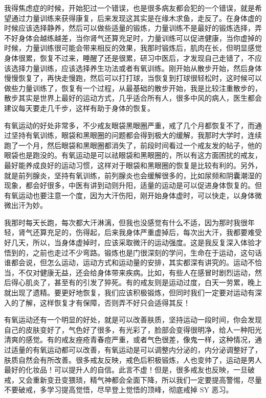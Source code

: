 \documentclass{ctexart}
\begin{document}
我得焦虑症的时候，开始犯过一个错误，也是很多病友都会犯的一个错误，就是希望通过力量训练来获得康复，后来发现这其实是在缘木求鱼，走反了。在身体虚的时候应该选择静养，然后可以做些适量的锻炼，力量训练不是最好的锻炼选择，弄不好身体会越练越差，当你肾气还算充足时，力量训练可以促进健康，当你虚掉的时候，力量训练很可能会带来相反的效果，我那时锻炼后，肌肉在长，但明显感觉身体很累，恢复不过来，睡醒了还是很累，研习中医后，才发现自己走错了，不应该选择力量训练，应该选择养生功法或者有氧训练。刚开始从散步开始，然后身体慢慢恢复了，再快走慢跑，然后可以打打球，当恢复到打球很轻松时，这时候可以做些力量训练了，恢复有一个过程，从最基础的散步开始，我是比较注重散步的，散步其实是世界上最好的运动方式，几乎适合所有人，很多中风的病人，医生都会建议每天要走几千步，这样有助于身体的恢复。

有氧运动的好处非常多，不少戒友眼袋黑眼圈严重，戒了几个月都恢复不了，而通过坚持有氧训练，眼袋和黑眼圈的问题都会得到极大的缓解，我那时大学时，连续跑了一个月，然后眼袋和黑眼圈都消失了，前段时间看过一个戒友发的帖子，他的眼袋也是跑没的。有氧运动是可以祛眼袋和黑眼圈的，所以有这方面困扰的戒友，最好能养成良好的运动习惯，这样对于眼袋和黑眼圈的恢复是比较有利的。另外，就是前列腺炎，坚持有氧训练，前列腺炎也会缓解很多的，比如尿频和阴囊潮湿的现象，都会好很多，中医有讲到动则升阳，适量的运动是可以促进身体恢复的。但有氧运动也要注意一个度，因为大汗伤阳，刚开始身体虚时，可以快走，以身体微微出汗为妙。

我那时每天长跑，每次都大汗淋漓，但我也没感觉有什么不适，因为那时我很年轻，肾气还算充足的，伤得起，后来我身体严重虚掉后，每次出大汗，我都要难受好几天，所以，当身体虚掉时，应该采取微汗的运动强度。这是我反复深入体验才悟到的，之前也走过不少弯路。锻炼也是门很深刻的学问，生命在于运动，这句话谁都会说，但怎么运动，运动方式和运动量的安排，其实都深有讲究的。运动不恰当，不仅对健康无益，还会给身体带来疾病。比如，有些人在感冒时剧烈运动，然后得心肌炎了，甚至有的引发了猝死。有的戒友则是运动过度，白天一劳累，晚上就出现了遗精。要更好地恢复，我们应该积极锻炼，但同时我们一定要对运动有深入的了解，这样恢复才有保障，否则弄不好只会适得其反！

有氧运动还有一个明显的好处，就是可以改善肤质，坚持运动一段时间，你会发现自己的皮肤变好了，气色好了很多，有光彩了，脸部会变得很明净，给人一种阳光清爽的感觉。有的戒友痤疮青春痘严重，或者气色很差，像鬼一样，这种情况，通过适量的有氧运动都可以改善，有氧运动是可以调整内分泌的，内分泌调整好了，肤质自然会有所改善。很多戒友反映，戒色后积极锻炼，人也变帅了，运动是男人最好的化妆品！可以提升人的自信。此言不虚！但是，很多戒友也反映，一旦破戒，又会重新变丑变猥琐，精气神都会全面下降，所以我们一定要提高警惕，尽量不要破戒，多学习提高觉悟，尽早登上觉悟的顶峰，彻底戒掉 SY 恶习。
\end{document}
